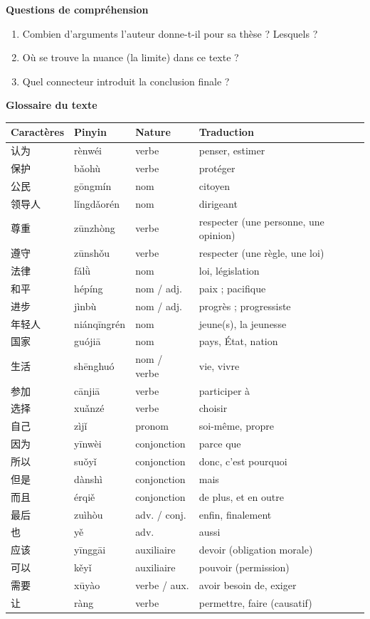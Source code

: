 \documentclass[11pt]{article}
\begin{document}
\textbf{Questions de compréhension}
\begin{enumerate}
\item Combien d'arguments l'auteur donne-t-il pour sa thèse ? Lesquels ?
\item Où se trouve la nuance (la limite) dans ce texte ?
\item Quel connecteur introduit la conclusion finale ?
\end{enumerate}

\textbf{Glossaire du texte}

\begin{center}\begin{tabularx}{\linewidth}{|X|X|X|X|}\hline
\rowcolor{popblueL} Caractères & Pinyin & Nature & Traduction \\ \hline
认为 & rènwéi & verbe & penser, estimer \\ \hline
保护 & bǎohù & verbe & protéger \\ \hline
公民 & gōngmín & nom & citoyen \\ \hline
领导人 & lǐngdǎorén & nom & dirigeant \\ \hline
尊重 & zūnzhòng & verbe & respecter (une personne, une opinion) \\ \hline
遵守 & zūnshǒu & verbe & respecter (une règle, une loi) \\ \hline
法律 & fǎlǜ & nom & loi, législation \\ \hline
和平 & hépíng & nom / adj. & paix ; pacifique \\ \hline
进步 & jìnbù & nom / adj. & progrès ; progressiste \\ \hline
年轻人 & niánqīngrén & nom & jeune(s), la jeunesse \\ \hline
国家 & guójiā & nom & pays, État, nation \\ \hline
生活 & shēnghuó & nom / verbe & vie, vivre \\ \hline
参加 & cānjiā & verbe & participer à \\ \hline
选择 & xuǎnzé & verbe & choisir \\ \hline
自己 & zìjǐ & pronom & soi-même, propre \\ \hline
因为 & yīnwèi & conjonction & parce que \\ \hline
所以 & suǒyǐ & conjonction & donc, c'est pourquoi \\ \hline
但是 & dànshì & conjonction & mais \\ \hline
而且 & érqiě & conjonction & de plus, et en outre \\ \hline
最后 & zuìhòu & adv. / conj. & enfin, finalement \\ \hline
也 & yě & adv. & aussi \\ \hline
应该 & yīnggāi & auxiliaire & devoir (obligation morale) \\ \hline
可以 & kěyǐ & auxiliaire & pouvoir (permission) \\ \hline
需要 & xūyào & verbe / aux. & avoir besoin de, exiger \\ \hline
让 & ràng & verbe & permettre, faire (causatif) \\ \hline
\end{tabularx}\end{center}
\end{document}

